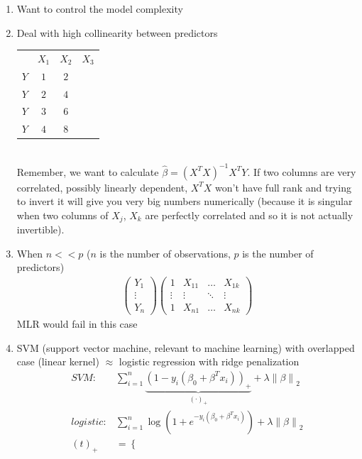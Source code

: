 \documentclass[12 pt]{article}
\begin{document}
  \begin{enumerate}
  \item Want to control the model complexity
  \item Deal with high collinearity between predictors
    \\
    \begin{tabular}{c c c c}
      &$X_1$&$X_2$&$X_3$
      \\ $Y$ & $1$ & $2$
      \\ $Y$ & $2$ & $4$
      \\ $Y$ & $3$ & $6$
      \\ $Y$ & $4$ & $8$
    \end{tabular}
    \\ Remember, we want to calculate $\hat{\beta} =
    (X^TX)^{-1}X^TY$. If two columns are very correlated, possibly
    linearly dependent, $X^TX$ won't have full rank and trying to
    invert it will give you very big numbers numerically (because it
    is singular when two columns of $X_j$, $X_k$ are perfectly
    correlated and so it is not actually invertible).
  \item When $n << p$ ($n$ is the number of observations, $p$ is the
    number of predictors)
    \begin{align*}
      \begin{pmatrix}
        Y_1 \\ \vdots \\ Y_n
      \end{pmatrix}
      \begin{pmatrix}
        1 & X_{11} & \ldots & X_{1k}
        \\ \vdots & \vdots & \ddots & \vdots
        \\ 1 & X_{n1} & \ldots & X_{nk}
      \end{pmatrix}
    \end{align*}
    MLR would fail in this case
  \item SVM (support vector machine, relevant to machine learning)
    with overlapped case (linear kernel) $\approx$ logistic regression
    with ridge penalization
    \begin{align*}
      SVM: & \sum_{i=1}^n \underbrace{(1-y_i (\beta_0 + \beta^T x_i))_+}_{(\cdot)_+} + \lambda
             \left\lVert \beta \right\rVert_2
      \\ logistic: & \sum_{i=1}^n \log (1 + e^{-y_i(\beta_0 + \beta^T
                     x_i)}) + \lambda \left\lVert \beta \right\rVert_2
      \\ (t)_{+} & =
                   \begin{cases}

\end{cases}
\end{align*}
\end{enumerate}
\end{document}

